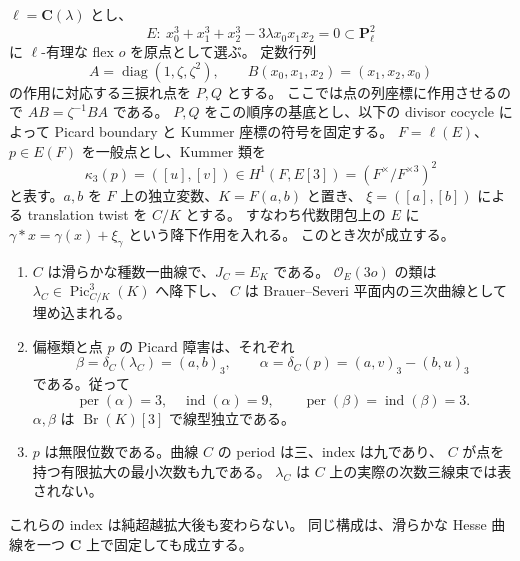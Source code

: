 \begin{proposition}
\label{prop:nfm-unsplit-genus-one-picard-nine}
$\ell=\mathbf C(\lambda)$ とし、
\[
 E:\ x_0^3+x_1^3+x_2^3-3\lambda x_0x_1x_2=0
 \subset\mathbf P^2_\ell
\]
に $\ell$-有理な flex $o$ を原点として選ぶ。
定数行列
\[
 A=\operatorname{diag}(1,\zeta,\zeta^2),\qquad
 B(x_0,x_1,x_2)=(x_1,x_2,x_0)
\]
の作用に対応する三捩れ点を $P,Q$ とする。
ここでは点の列座標に作用させるので $AB=\zeta^{-1}BA$ である。
$P,Q$ をこの順序の基底とし、以下の divisor cocycle によって
Picard boundary と Kummer 座標の符号を固定する。
$F=\ell(E)$、$p\in E(F)$ を一般点とし、Kummer 類を
\[
 \kappa_3(p)=([u],[v])
 \in H^1(F,E[3])=(F^\times/F^{\times3})^2
\]
と表す。$a,b$ を $F$ 上の独立変数、$K=F(a,b)$ と置き、
$\xi=([a],[b])$ による translation twist を $C/K$ とする。
すなわち代数閉包上の $E$ に
$\gamma*x=\gamma(x)+\xi_\gamma$ という降下作用を入れる。
このとき次が成立する。
\begin{enumerate}
 \item $C$ は滑らかな種数一曲線で、$J_C=E_K$ である。
 $\mathcal O_E(3o)$ の類は
 $\lambda_C\in\operatorname{Pic}^3_{C/K}(K)$ へ降下し、
 $C$ は Brauer--Severi 平面内の三次曲線として埋め込まれる。
 \item 偏極類と点 $p$ の Picard 障害は、それぞれ
 \[
  \beta=\delta_C(\lambda_C)=(a,b)_3,
  \qquad
  \alpha=\delta_C(p)=(a,v)_3-(b,u)_3
 \]
 である。従って
 \[
  \operatorname{per}(\alpha)=3,\quad
  \operatorname{ind}(\alpha)=9,\qquad
  \operatorname{per}(\beta)=\operatorname{ind}(\beta)=3.
 \]
 $\alpha,\beta$ は $\operatorname{Br}(K)[3]$ で線型独立である。
 \item $p$ は無限位数である。曲線 $C$ の period は三、index は九であり、
 $C$ が点を持つ有限拡大の最小次数も九である。
 $\lambda_C$ は $C$ 上の実際の次数三線束では表されない。
\end{enumerate}
これらの index は純超越拡大後も変わらない。
同じ構成は、滑らかな Hesse 曲線を一つ $\mathbf C$ 上で固定しても成立する。
\end{proposition}

